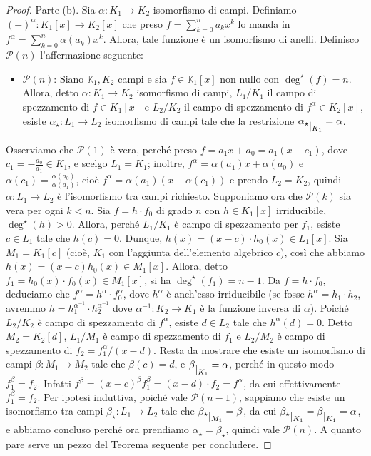 \documentclass{article}
\theoremstyle{definition}
\begin{document}
\begin{proof}
\noindent Parte (b). Sia $\alpha\colon K_1\to K_2$ isomorfismo di campi. Definiamo $(-)^{\alpha}\colon K_1[x]\to K_2[x]$ che preso $f=\sum\limits_{k=0}^n a_k x^k$ lo manda in $f^{\alpha}=\sum\limits_{k=0}^n \alpha(a_k) x^k$. Allora, tale funzione è un isomorfismo di anelli. Definisco $\mathcal{P}(n)$ l'affermazione seguente: 
\begin{itemize}
\item $\mathcal{P}(n)$: Siano $\mathbb{K}_1, K_2$ campi e sia $f\in\mathbb{K}_1[x]$ non nullo con $\deg^{\star}(f)=n$. Allora, detto $\alpha\colon K_1\to K_2$ isomorfismo di campi, $L_1/K_1$ il campo di spezzamento di $f\in K_1[x]$ e $L_2/K_2$ il campo di spezzamento di $f^{\alpha}\in K_2[x]$, esiste $\alpha_{\star}\colon L_1\to L_2$ isomorfismo di campi tale che la restrizione $\alpha_{\star} \raisebox{-.5em}{$\vert_{K_1}$}=\alpha$.
\end{itemize}
Osserviamo che $\mathcal{P}(1)$ è vera, perché preso $f=a_1x+a_0=a_1(x-c_1)$, dove $c_1=-\frac{a_0}{a_1}\in K_1$, e scelgo $L_1=K_1$; inoltre, $f^{\alpha}=\alpha(a_1)x+\alpha(a_0)$ e $\alpha(c_1)=\frac{\alpha(a_0)}{\alpha(a_1)}$, cioè $f^{\alpha}=\alpha(a_1)(x-\alpha(c_1))$ e prendo $L_2=K_2$, quindi $\alpha\colon L_1\to L_2$ è l'isomorfismo tra campi richiesto. Supponiamo ora che $\mathcal{P}(k)$ sia vera per ogni $k<n$. Sia $f=h\cdot f_0$ di grado $n$ con $h\in K_1[x]$ irriducibile, $\deg^{\star}(h)>0$. Allora, perché $L_1/K_1$ è campo di spezzamento per $f_1$, esiste $c\in L_1$ tale che $h(c)=0$. Dunque, $h(x)=(x-c)\cdot h_0(x)\in L_1[x]$. Sia $M_1=K_1[c]$ (cioè, $K_1$ con l'aggiunta dell'elemento algebrico $c$), così che abbiamo $h(x)=(x-c)h_0(x)\in M_1[x]$. Allora, detto $f_1=h_0(x)\cdot f_0(x)\in M_1[x]$, si ha $\deg^{\star}(f_1)=n-1$. Da $f=h\cdot f_0$, deduciamo che $f^{\alpha}=h^{\alpha}\cdot f_0^{\alpha}$, dove $h^{\alpha}$ è anch'esso irriducibile (se fosse $h^{\alpha}=h_1\cdot h_2$, avremmo $h=h_1^{\alpha^{-1}}\cdot h_2^{\alpha^{-1}}$ dove $\alpha^{-1}\colon K_2\to K_1$ è la funzione inversa di $\alpha$). Poiché $L_2/K_2$ è campo di spezzamento di $f^{\alpha}$, esiste $d\in L_2$ tale che $h^{\alpha}(d)=0$. Detto $M_2=K_2[d]$, $L_1/M_1$ è campo di spezzamento di $f_1$ e $L_2/M_2$ è campo di spezzamento di $f_2=f_1^{\alpha}/(x-d)$. Resta da mostrare che esiste un isomorfismo di campi $\beta\colon M_1\to M_2$ tale che $\beta(c)=d$, e $\beta \raisebox{-.5em}{$\vert_{K_1}$}=\alpha$, perché in questo modo $f_1^{\beta}=f_2$. Infatti $f^{\beta}=(x-c)^{\beta}f_1^{\beta}=(x-d)\cdot f_2=f^{\alpha}$, da cui effettivamente $f_1^{\beta}=f_2$. Per ipotesi induttiva, poiché vale $\mathcal{P}(n-1)$, sappiamo che esiste un isomorfismo tra campi $\beta_{\star}\colon L_1\to L_2$ tale che $\beta_{\star} \raisebox{-.5em}{$\vert_{M_1}$}=\beta$, da cui $\beta_{\star} \raisebox{-.5em}{$\vert_{K_1}$}=\beta \raisebox{-.5em}{$\vert_{K_1}$}=\alpha$, e abbiamo concluso perché ora prendiamo $\alpha_{\star}=\beta_{\star}$, quindi vale $\mathcal{P}(n)$. A quanto pare serve un pezzo del Teorema seguente per concludere.
\end{proof}
\end{document}
